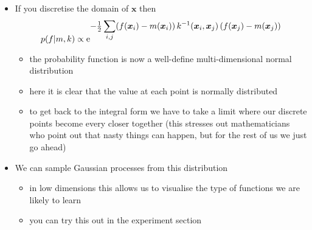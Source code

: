 \documentclass[11pt]{article}
\newcommand{\E}[1]{{\rm e}^{\displaystyle #1}}
\begin{document}
\begin{itemize}
\begin{itemize}
\item If you discretise the domain of \(\bm{x}\) then
$$ p(f|m,k) \propto \E{-\tfrac{1}{2} \sum_{i,j} (f(\bm{x}_i)-m(\bm{x}_i)) 
        \, k^{-1}(\bm{x}_i,\bm{x}_j) \, (f(\bm{x}_j) -m(\bm{x}_j)) } $$
\begin{itemize}
\item the probability function is now a well-define  multi-dimensional
normal distribution
\item here it is clear that the value at each point is normally
distributed
\item to get back to the integral form we have to take a limit where our
discrete points become every closer together (this stresses out
mathematicians who point out that nasty things can happen, but
for the rest of us we just go ahead)
\end{itemize}
\item We can sample Gaussian processes from this distribution
\begin{itemize}
\item in low dimensions this allows us to visualise the type of
functions we are likely to learn
\item you can try this out in the experiment section
\end{itemize}
\end{itemize}
\end{itemize}
\end{document}
